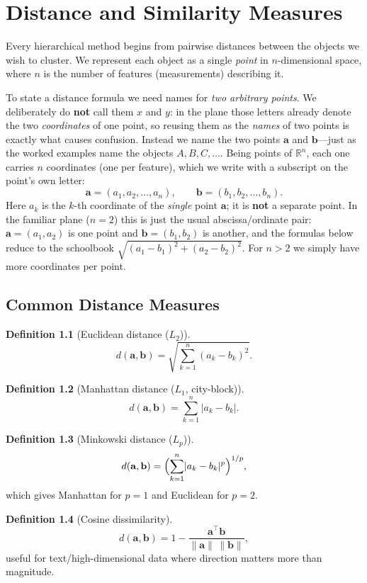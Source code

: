 \documentclass[11pt,a4paper]{report}
\theoremstyle{definition}
\newtheorem{definition}{Definition}[chapter]
\theoremstyle{plain}
\theoremstyle{remark}
\newcommand{\R}{\mathbb{R}}
\newcommand{\va}{\mathbf{a}}
\newcommand{\vb}{\mathbf{b}}
\begin{document}
\chapter{Distance and Similarity Measures}

Every hierarchical method begins from pairwise distances between the objects we
wish to cluster. We represent each object as a single \emph{point} in
$n$-dimensional space, where $n$ is the number of features (measurements)
describing it.

To state a distance formula we need names for \emph{two arbitrary points}. We
deliberately do \textbf{not} call them $x$ and $y$: in the plane those letters
already denote the two \emph{coordinates} of one point, so reusing them as the
\emph{names} of two points is exactly what causes confusion. Instead we name the
two points $\va$ and $\vb$---just as the worked examples name the objects
$A,B,C,\dots$. Being points of $\R^n$, each one carries $n$ coordinates (one per
feature), which we write with a subscript on the point's own letter:
\[
\va=(a_1,a_2,\dots,a_n),\qquad \vb=(b_1,b_2,\dots,b_n).
\]
Here $a_k$ is the $k$-th coordinate of the \emph{single} point $\va$; it is
\textbf{not} a separate point. In the familiar plane ($n=2$) this is just the
usual abscissa/ordinate pair: $\va=(a_1,a_2)$ is one point and
$\vb=(b_1,b_2)$ is another, and the formulas below reduce to the schoolbook
$\sqrt{(a_1-b_1)^2+(a_2-b_2)^2}$. For $n>2$ we simply have more coordinates per
point.

\section{Common Distance Measures}
\begin{definition}[Euclidean distance ($L_2$)]
\begin{equation}
d(\va,\vb)=\sqrt{\sum_{k=1}^{n}(a_k-b_k)^2}.
\label{eq:euclid}
\end{equation}
\end{definition}
\begin{definition}[Manhattan distance ($L_1$, city-block)]
\[
d(\va,\vb)=\sum_{k=1}^{n}\lvert a_k-b_k\rvert .
\]
\end{definition}
\begin{definition}[Minkowski distance ($L_p$)]
\[
d(\va,\vb)=\Bigl(\sum_{k=1}^{n}\lvert a_k-b_k\rvert^{p}\Bigr)^{1/p},
\]
which gives Manhattan for $p=1$ and Euclidean for $p=2$.
\end{definition}
\begin{definition}[Cosine dissimilarity]
\[
d(\va,\vb)=1-\frac{\va^{\!\top}\vb}{\lVert\va\rVert\,\lVert\vb\rVert},
\]
useful for text/high-dimensional data where direction matters more than
magnitude.
\end{definition}
\end{document}
